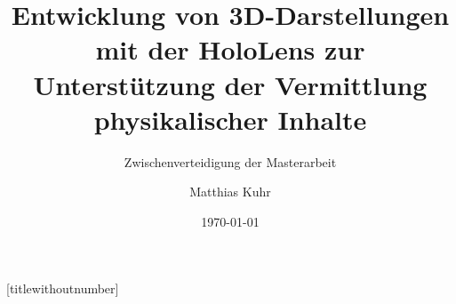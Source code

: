 \documentclass{beamer}
\title{Entwicklung von 3D-Darstellungen mit der HoloLens zur Unterstützung der Vermittlung physikalischer Inhalte}
\subtitle{Zwischenverteidigung der Masterarbeit}
\author{Matthias Kuhr}
\date{\today}
\begin{document}
{
	[titlewithoutnumber] %
	\maketitle
}



\end{document}
